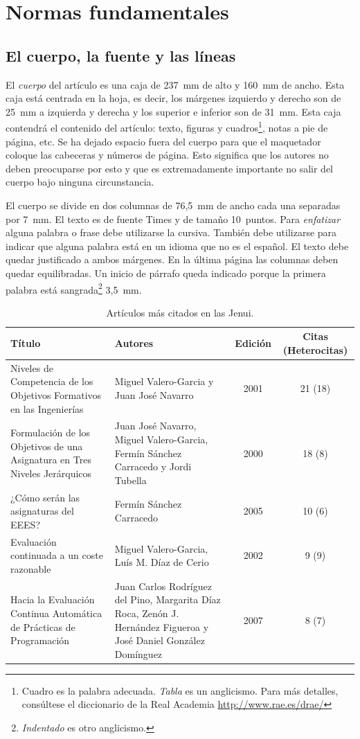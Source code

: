 \documentclass[twocolumn,twoside,a4paper, 10pt]{article}
\begin{document}
\section{Normas fundamentales \label{sec:fund}} 

\subsection{El cuerpo, la fuente y las líneas}

El \emph{cuerpo} del artículo es una caja de 237~mm de alto y 160~mm
de ancho.  Esta caja está centrada en la hoja, es decir, los márgenes
izquierdo y derecho son de 25~mm a izquierda y derecha y los superior
e inferior son de 31~mm.  Esta caja contendrá el contenido del
artículo: texto, figuras y cuadros\footnote{Cuadro es la palabra
adecuada. \emph{Tabla} es un anglicismo.  Para más detalles,
consúltese el diccionario de la Real Academia
\url{http://www.rae.es/drae/}}, notas a pie de página, etc.  Se ha
dejado espacio fuera del cuerpo para que el maquetador coloque las
cabeceras y números de página.  Esto significa que los autores no
deben preocuparse por esto y que es extremadamente importante no 
salir del cuerpo bajo ninguna circunstancia.

El cuerpo se divide en dos columnas de 76,5~mm de ancho cada una 
separadas por 7~mm. El texto es de fuente Times y de tamaño 10~puntos. 
Para \emph{enfatizar} alguna palabra o frase debe utilizarse la 
cursiva. También debe utilizarse para indicar que alguna palabra está 
en un idioma que no es el español. El texto debe quedar justificado a 
ambos márgenes. En la última página las columnas deben quedar 
equilibradas.
Un inicio de párrafo queda indicado porque la primera palabra está
sangrada\footnote{\emph{Indentado} es otro anglicismo.} 3,5~mm.

\begin{table}
	\begin{center}
	\begin{tabular}{p{5.2cm}p{4.5cm}cc}
		\textbf{Título} & \textbf{Autores} & \textbf{Edición} & 
		\textbf{Citas (Heterocitas)}\\\hline
		Niveles de Competencia de los Objetivos Formativos en las 
		Ingenierías & Miguel Valero-Garcia y Juan José Navarro & 2001 
		& 21 (18) \\\hline
		Formulación de los Objetivos de una Asignatura en Tres Niveles
		Jerárquicos & Juan José Navarro, Miguel Valero-Garcia, Fermín
		Sánchez Carracedo y Jordi Tubella & 2000 & 18 (8) \\\hline
		¿Cómo serán las asignaturas del EEES? & Fermín Sánchez
		Carracedo & 2005 & 10 (6) \\\hline
		Evaluación continuada a un coste razonable & Miguel
		Valero-Garcia, Luís M. Díaz de Cerio & 2002 & 9 (9) \\\hline
		Hacia la Evaluación Continua Automática de Prácticas de
		Programación & Juan Carlos Rodríguez del Pino, Margarita Díaz
		Roca, Zenón J. Hernández Figueroa y José Daniel González
		Domínguez & 2007 & 8 (7) 
	\end{tabular}
	\end{center}
	\caption{\label{tab:mascit}Artículos más citados en las Jenui.}
\end{table}
\end{document}
